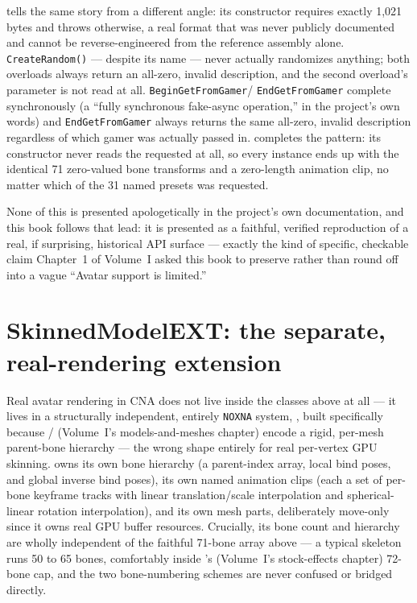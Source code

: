  tells the same story from a different angle: its constructor
requires exactly 1{,}021 bytes and throws otherwise, a real format that was never publicly
documented and cannot be reverse-engineered from the reference assembly alone.
\texttt{CreateRandom()} --- despite its name --- never actually randomizes anything; both
overloads always return an all-zero, invalid description, and the second overload's
 parameter is not read at all. \texttt{BeginGetFromGamer}/%
\texttt{EndGetFromGamer} complete synchronously (a ``fully synchronous fake-async
operation,'' in the project's own words) and \texttt{EndGetFromGamer} always returns the same
all-zero, invalid description regardless of which gamer was actually passed in.
 completes the pattern: its constructor never reads the requested
 at all, so every instance ends up with the identical 71
zero-valued bone transforms and a zero-length animation clip, no matter which of the 31 named
presets was requested.

None of this is presented apologetically in the project's own documentation, and this book
follows that lead: it is presented as a faithful, verified reproduction of a real, if
surprising, historical API surface --- exactly the kind of specific, checkable claim
Chapter~1 of Volume~I asked this book to preserve rather than round off into a vague ``Avatar
support is limited.''

\section{SkinnedModelEXT: the separate, real-rendering extension}

Real avatar rendering in CNA does not live inside the classes above at all --- it lives in a
structurally independent, entirely \texttt{NOXNA} system, , built
specifically because / (Volume~I's models-and-meshes
chapter) encode a rigid, per-mesh parent-bone hierarchy --- the wrong shape entirely for
real per-vertex GPU skinning.  owns its own bone hierarchy (a
parent-index array, local bind poses, and global inverse bind poses), its own named animation
clips (each a set of per-bone keyframe tracks with linear translation/scale interpolation and
spherical-linear rotation interpolation), and its own mesh parts, deliberately move-only since
it owns real GPU buffer resources. Crucially, its bone count and hierarchy are wholly
independent of the faithful 71-bone  array above --- a typical
 skeleton runs 50 to 65 bones, comfortably inside
's (Volume~I's stock-effects chapter) 72-bone cap, and the
two bone-numbering schemes are never confused or bridged directly.

